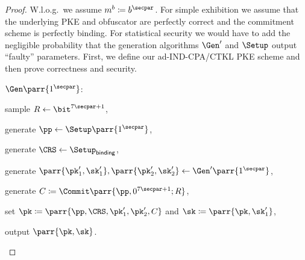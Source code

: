 \begin{proof}
    W.l.o.g.\ we assume \(m^b \coloneqq b^\secpar\).
    For simple exhibition we assume that the underlying PKE and obfuscator are perfectly correct and the commitment scheme is perfectly binding.
    For statistical security we would have to add the negligible probability that the generation algorithms \(\Gen'\) and \(\Setup\) output \enquote{faulty} parameters.
    First, we define our ad-IND-CPA/CTKL PKE scheme and then prove correctness and security.
    \begin{sitemize}
        \item \(\Gen\parr{1^\secpar}\):
        \begin{sitemize}
            \item sample \(R \gets \bit^{7\secpar+1}\),
            \item generate \(\pp \gets \Setup\parr{1^{\secpar}}\),
            \item generate \(\CRS \gets \Setup_{\textsf{binding}}\),
            \item generate \(\parr{\pk'_1,\sk'_1}, \parr{\pk'_2,\sk'_2} \gets \Gen'\parr{1^{\secpar}}\),
            \item generate \(C \coloneqq \Commit\parr{\pp,0^{7\secpar+1};R}\),
            \item set \(\pk \coloneqq \parr{\pp,\CRS,\pk'_1,\pk'_2,C}\) and \(\sk \coloneqq \parr{\pk,\sk'_1}\),
            \item output \(\parr{\pk,\sk}\).
        \end{sitemize}


\end{sitemize}
\end{proof}
